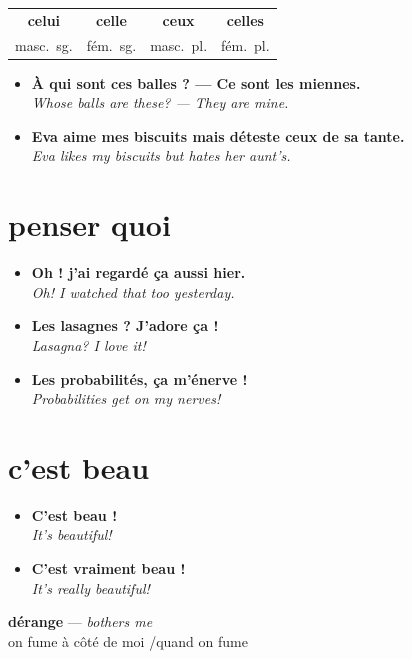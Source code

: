 \documentclass[11pt,a4paper]{article}
\newcommand{\pair}[2]{%
  \item \textbf{#1}\\
  {\color{noteblue}\textit{#2}}%
}
\begin{document}
\begin{center}
{\large
\begin{tabular}{cccc}
\textbf{celui} & \textbf{celle} & \textbf{ceux} & \textbf{celles}\\
{\small masc.\ sg.} & {\small f\'{e}m.\ sg.} & {\small masc.\ pl.} & {\small f\'{e}m.\ pl.}
\end{tabular}}
\end{center}

\vspace{0.4em}

\begin{exbox}
\begin{itemize}[leftmargin=1.2em,itemsep=0.55em]
  \pair{\`{A} qui sont ces balles ? --- Ce sont les miennes.}
       {Whose balls are these? --- They are mine.}
  \pair{Eva aime mes biscuits mais d\'{e}teste ceux de sa tante.}
       {Eva likes my biscuits but hates her aunt's.}
\end{itemize}
\end{exbox}

\section*{penser quoi}

\begin{exbox}
\begin{itemize}[leftmargin=1.2em,itemsep=0.55em]
  \pair{Oh ! j'ai regard\'{e} \c{c}a aussi hier.}
       {Oh! I watched that too yesterday.}
  \pair{Les lasagnes ? J'adore \c{c}a !}
       {Lasagna? I love it!}
  \pair{Les probabilit\'{e}s, \c{c}a m'\'{e}nerve !}
       {Probabilities get on my nerves!}
\end{itemize}
\end{exbox}

\section*{c'est beau}

\begin{exbox}
\begin{itemize}[leftmargin=1.2em,itemsep=0.55em]
  \pair{C'est beau !}
       {It's beautiful!}
  \pair{C'est vraiment beau !}
       {It's really beautiful!}
\end{itemize}
\end{exbox}

\begin{enbox}
\textbf{d\'{e}range} --- \textit{bothers me}\\[0.3em]
on fume \`{a} c\^{o}t\'{e} de moi \quad/\quad quand on fume
\end{enbox}
\end{document}
